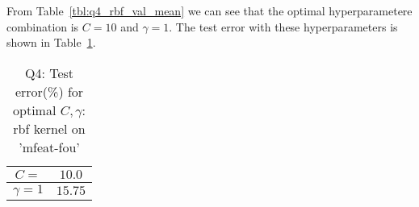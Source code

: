 From Table~\ref{tbl:q4_rbf_val_mean} we can see that the optimal hyperparametere combination is $C=10$ and $\gamma=1$. The test error with these hyperparameters is shown in Table~\ref{tbl:q4_rbf_test_error}.
\begin{table}[ht]
	\centering
	\caption{Q4: Test error(\%) for optimal $C,\gamma$: rbf kernel on 'mfeat-fou'}
	\begin{tabular}[t]{cc} 
		\hline
		$C=$ & $10.0$ \\ [0.5ex] 
		\hline
		$\gamma=1$ & $15.75$\\[1ex]
		\hline
	\end{tabular}
	\label{tbl:q4_rbf_test_error}
\end{table}